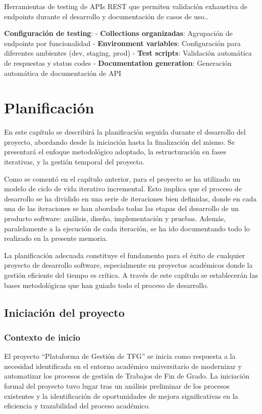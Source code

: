 \documentclass[12pt,a4paper,oneside]{report}
\begin{document}
Herramientas de testing de APIs REST que permiten validación exhaustiva
de endpoints durante el desarrollo y documentación de casos de uso..

\textbf{Configuración de testing}: - \textbf{Collections organizadas}:
Agrupación de endpoints por funcionalidad - \textbf{Environment
variables}: Configuración para diferentes ambientes (dev, staging, prod)
- \textbf{Test scripts}: Validación automática de respuestas y status
codes - \textbf{Documentation generation}: Generación automática de
documentación de API

\chapter{Planificación}\label{planificaciuxf3n}
En este capítulo se describirá la planificación seguida durante el
desarrollo del proyecto, abordando desde la iniciación hasta la
finalización del mismo. Se presentará el enfoque metodológico adoptado,
la estructuración en fases iterativas, y la gestión temporal del
proyecto.

Como se comentó en el capítulo anterior, para el proyecto se ha
utilizado un modelo de ciclo de vida iterativo incremental. Esto implica
que el proceso de desarrollo se ha dividido en una serie de iteraciones
bien definidas, donde en cada una de las iteraciones se han abordado
todas las etapas del desarrollo de un producto software: análisis,
diseño, implementación y pruebas. Además, paralelamente a la ejecución
de cada iteración, se ha ido documentando todo lo realizado en la
presente memoria.

La planificación adecuada constituye el fundamento para el éxito de
cualquier proyecto de desarrollo software, especialmente en proyectos
académicos donde la gestión eficiente del tiempo es crítica. A través de
este capítulo se establecerán las bases metodológicas que han guiado
todo el proceso de desarrollo.

\section{Iniciación del proyecto}\label{iniciaciuxf3n-del-proyecto}

\subsection{Contexto de inicio}\label{contexto-de-inicio}

El proyecto ``Plataforma de Gestión de TFG'' se inicia como respuesta a
la necesidad identificada en el entorno académico universitario de
modernizar y automatizar los procesos de gestión de Trabajos de Fin de
Grado. La iniciación formal del proyecto tuvo lugar tras un análisis
preliminar de los procesos existentes y la identificación de
oportunidades de mejora significativas en la eficiencia y trazabilidad
del proceso académico.
\end{document}
